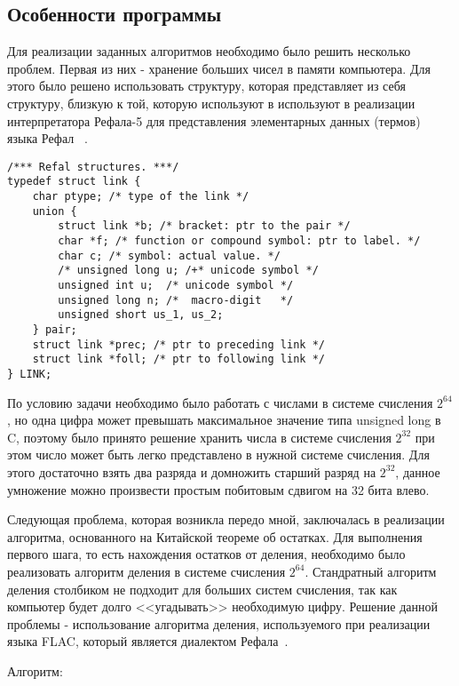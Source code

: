 \documentclass[14pt, russian]{scrartcl}
\begin{document}
\subsection{Особенности программы}
Для реализации заданных алгоритмов необходимо было решить несколько проблем. Первая из них - хранение больших чисел в памяти компьютера. Для этого было решено использовать структуру, которая представляет из себя структуру, близкую к той, которую используют в  используют в реализации интерпретатора Рефала-5 для представления элементарных данных (термов) языка Рефал ~\cite{Refal5}.
\label{lst:refal}
\begin{verbatim}
/*** Refal structures. ***/
typedef struct link {
    char ptype; /* type of the link */  
    union {
        struct link *b; /* bracket: ptr to the pair */
        char *f; /* function or compound symbol: ptr to label. */
        char c; /* symbol: actual value. */
        /* unsigned long u; /+* unicode symbol */
        unsigned int u;  /* unicode symbol */
        unsigned long n; /*  macro-digit   */
        unsigned short us_1, us_2;
    } pair;
    struct link *prec; /* ptr to preceding link */
    struct link *foll; /* ptr to following link */
} LINK;
\end{verbatim}

По условию задачи необходимо было работать с числами в системе счисления $2^{64}$, но одна цифра может превышать максимальное значение типа unsigned long в C, поэтому было принято решение хранить числа в системе счисления $2^{32}$ при этом число может быть легко представлено в нужной системе счисления. Для этого достаточно взять два разряда и домножить старший разряд на $2^{32}$, данное умножение можно произвести простым побитовым сдвигом на 32 бита влево.

Следующая проблема, которая возникла передо мной, заключалась в реализации алгоритма, основанного на Китайской теореме об остатках. Для выполнения первого шага, то есть нахождения остатков от деления, необходимо было реализовать алгоритм деления в системе счисления $2^{64}$. Стандратный алгоритм деления столбиком не подходит для больших систем счисления, так как компьютер будет долго <<угадывать>> необходимую цифру. Решение данной проблемы - использование алгоритма деления, используемого при реализации языка FLAC, который является диалектом Рефала~\cite{FLAC}.

Алгоритм:
\end{document}
